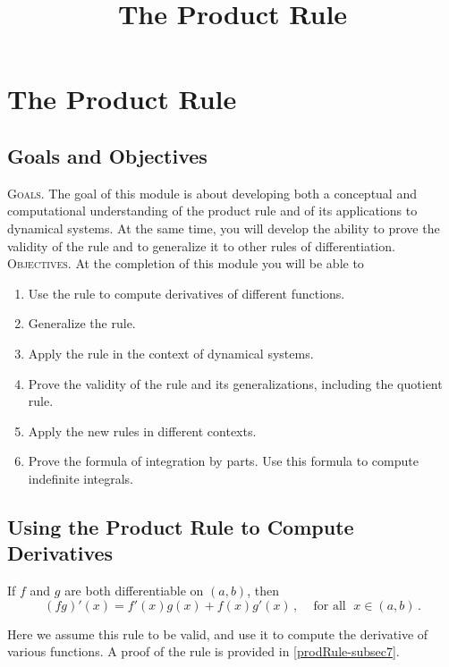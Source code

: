 \documentclass{ximera}
\title{The Product Rule}
\begin{document}
\maketitle
 
 \setcounter{chapter}{3}
\setcounter{section}{1}
\section{The Product Rule}
\subsection*{Goals and Objectives}

\textsc{Goals.} The goal of this module is about developing both a conceptual and computational understanding of the product rule and of its applications to dynamical systems. At the same time, you will develop the ability to prove the validity of the rule and to generalize it to other rules of differentiation.
\\

\noindent \textsc{Objectives.} At the completion of this module you will be able to
\begin{enumerate}
\item Use the rule to compute derivatives of different functions.
\item Generalize the rule.
\item Apply the rule in the context of dynamical systems.
\item Prove the validity of the rule and its generalizations, including the quotient rule.
\item Apply the new rules in different contexts.
\item Prove the formula of integration by parts. Use this formula to compute indefinite integrals.
\end{enumerate}




\subsection{Using the Product Rule to Compute Derivatives}\label{prodRule-subsec1}

\begin{theorem} If \(f\) and \(g\) are both differentiable on \((a,b)\), then
 \[(f g)'(x)= f'(x) g(x)+ f(x) g'(x)\,,  \;\;\;  \text{ for all } \; x \in (a,b)\,.\]
\end{theorem}
Here we assume this rule to be valid, and use it to compute the derivative of various functions. A proof of the rule is provided in \ref{prodRule-subsec7}.
\end{document}
